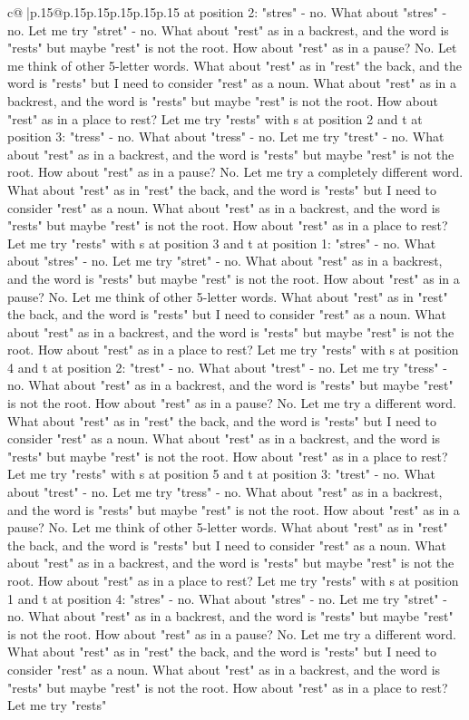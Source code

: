 \documentclass{article}
\begin{document}
{\begin{supertabular}{c@{$\;$}|p{.15\linewidth}@{}p{.15\linewidth}p{.15\linewidth}p{.15\linewidth}p{.15\linewidth}p{.15\linewidth}}
{{{at position 2: "stres" {-} no. What about "stres" {-} no. Let me try "stret" {-} no. What about "rest" as in a backrest, and the word is "rests" but maybe "rest" is not the root. How about "rest" as in a pause? No. Let me think of other 5{-}letter words. What about "rest" as in "rest" the back, and the word is "rests" but I need to consider "rest" as a noun. What about "rest" as in a backrest, and the word is "rests" but maybe "rest" is not the root. How about "rest" as in a place to rest? Let me try "rests" with s at position 2 and t at position 3: "tress" {-} no. What about "tress" {-} no. Let me try "trest" {-} no. What about "rest" as in a backrest, and the word is "rests" but maybe "rest" is not the root. How about "rest" as in a pause? No. Let me try a completely different word. What about "rest" as in "rest" the back, and the word is "rests" but I need to consider "rest" as a noun. What about "rest" as in a backrest, and the word is "rests" but maybe "rest" is not the root. How about "rest" as in a place to rest? Let me try "rests" with s at position 3 and t at position 1: "stres" {-} no. What about "stres" {-} no. Let me try "stret" {-} no. What about "rest" as in a backrest, and the word is "rests" but maybe "rest" is not the root. How about "rest" as in a pause? No. Let me think of other 5{-}letter words. What about "rest" as in "rest" the back, and the word is "rests" but I need to consider "rest" as a noun. What about "rest" as in a backrest, and the word is "rests" but maybe "rest" is not the root. How about "rest" as in a place to rest? Let me try "rests" with s at position 4 and t at position 2: "trest" {-} no. What about "trest" {-} no. Let me try "tress" {-} no. What about "rest" as in a backrest, and the word is "rests" but maybe "rest" is not the root. How about "rest" as in a pause? No. Let me try a different word. What about "rest" as in "rest" the back, and the word is "rests" but I need to consider "rest" as a noun. What about "rest" as in a backrest, and the word is "rests" but maybe "rest" is not the root. How about "rest" as in a place to rest? Let me try "rests" with s at position 5 and t at position 3: "trest" {-} no. What about "trest" {-} no. Let me try "tress" {-} no. What about "rest" as in a backrest, and the word is "rests" but maybe "rest" is not the root. How about "rest" as in a pause? No. Let me think of other 5{-}letter words. What about "rest" as in "rest" the back, and the word is "rests" but I need to consider "rest" as a noun. What about "rest" as in a backrest, and the word is "rests" but maybe "rest" is not the root. How about "rest" as in a place to rest? Let me try "rests" with s at position 1 and t at position 4: "stres" {-} no. What about "stres" {-} no. Let me try "stret" {-} no. What about "rest" as in a backrest, and the word is "rests" but maybe "rest" is not the root. How about "rest" as in a pause? No. Let me try a different word. What about "rest" as in "rest" the back, and the word is "rests" but I need to consider "rest" as a noun. What about "rest" as in a backrest, and the word is "rests" but maybe "rest" is not the root. How about "rest" as in a place to rest? Let me try "rests" }}}
\end{supertabular}}
\end{document}
